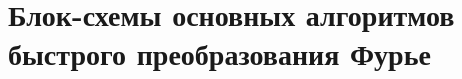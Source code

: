 \documentclass[14pt]{extarticle}
\begin{document}
%


\appendix

\section{Блок-схемы основных алгоритмов быстрого преобразования Фурье}

\begin{figure}[h!]
\centering
\scalebox{.86}{
	
}
\end{figure}
\end{document}

